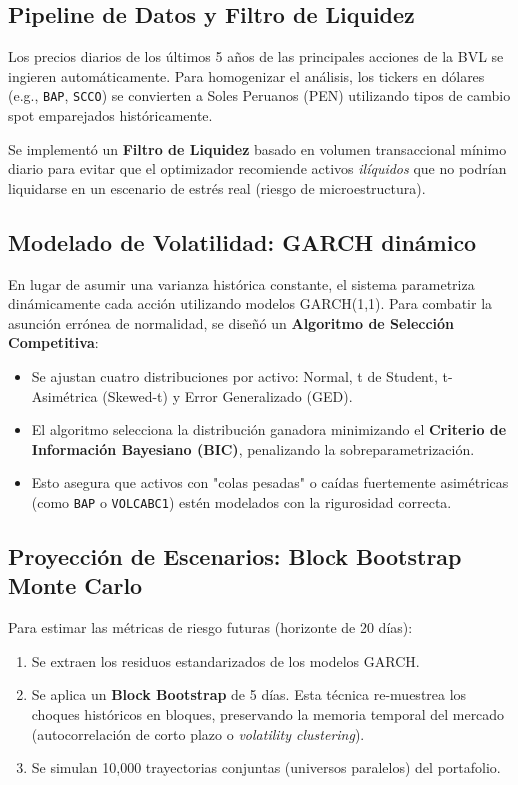 \documentclass[11pt,a4paper]{article}
\begin{document}
\subsection{Pipeline de Datos y Filtro de Liquidez}
Los precios diarios de los últimos 5 años de las principales acciones de la BVL se ingieren automáticamente. Para homogenizar el análisis, los tickers en dólares (e.g., \texttt{BAP}, \texttt{SCCO}) se convierten a Soles Peruanos (PEN) utilizando tipos de cambio spot emparejados históricamente.

Se implementó un \textbf{Filtro de Liquidez} basado en volumen transaccional mínimo diario para evitar que el optimizador recomiende activos \textit{ilíquidos} que no podrían liquidarse en un escenario de estrés real (riesgo de microestructura).

\subsection{Modelado de Volatilidad: GARCH dinámico}
En lugar de asumir una varianza histórica constante, el sistema parametriza dinámicamente cada acción utilizando modelos GARCH(1,1). Para combatir la asunción errónea de normalidad, se diseñó un \textbf{Algoritmo de Selección Competitiva}:
\begin{itemize}
    \item Se ajustan cuatro distribuciones por activo: Normal, t de Student, t-Asimétrica (Skewed-t) y Error Generalizado (GED).
    \item El algoritmo selecciona la distribución ganadora minimizando el \textbf{Criterio de Información Bayesiano (BIC)}, penalizando la sobreparametrización.
    \item Esto asegura que activos con "colas pesadas" o caídas fuertemente asimétricas (como \texttt{BAP} o \texttt{VOLCABC1}) estén modelados con la rigurosidad correcta.
\end{itemize}

\subsection{Proyección de Escenarios: Block Bootstrap Monte Carlo}
Para estimar las métricas de riesgo futuras (horizonte de 20 días):
\begin{enumerate}
    \item Se extraen los residuos estandarizados de los modelos GARCH.
    \item Se aplica un \textbf{Block Bootstrap} de 5 días. Esta técnica re-muestrea los choques históricos en bloques, preservando la memoria temporal del mercado (autocorrelación de corto plazo o \textit{volatility clustering}).
    \item Se simulan 10,000 trayectorias conjuntas (universos paralelos) del portafolio.
\end{enumerate}
\end{document}
